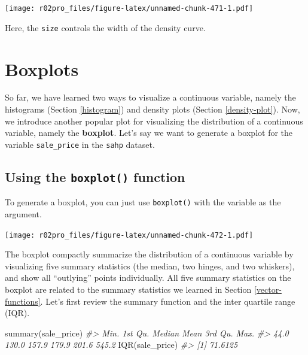 \documentclass[
]{book}
\newenvironment{Shaded}{\begin{snugshade}}{\end{snugshade}}
\newcommand{\CommentTok}[1]{\textcolor[rgb]{0.56,0.35,0.01}{\textit{#1}}}
\newcommand{\FunctionTok}[1]{\textcolor[rgb]{0.00,0.00,0.00}{#1}}
\newcommand{\NormalTok}[1]{#1}
\newcommand{\OtherTok}[1]{\textcolor[rgb]{0.56,0.35,0.01}{#1}}
\newcommand{\SpecialCharTok}[1]{\textcolor[rgb]{0.00,0.00,0.00}{#1}}
\begin{document}
\texttt{[image: r02pro\_files/figure-latex/unnamed-chunk-471-1.pdf]}

Here, the \texttt{size} controls the width of the density curve.

\hypertarget{boxplots}{%
\section{Boxplots}\label{boxplots}}

So far, we have learned two ways to visualize a continuous variable, namely the histograms (Section \ref{histogram}) and density plots (Section \ref{density-plot}). Now, we introduce another popular plot for visualizing the distribution of a continuous variable, namely the \textbf{boxplot}. Let's say we want to generate a boxplot for the variable \texttt{sale\_price} in the \texttt{sahp} dataset.

\hypertarget{using-the-boxplot-function}{%
\subsection{\texorpdfstring{Using the \texttt{boxplot()} function}{Using the boxplot() function}}\label{using-the-boxplot-function}}

To generate a boxplot, you can just use \texttt{boxplot()} with the variable as the argument.

\begin{Shaded}
\end{Shaded}

\texttt{[image: r02pro\_files/figure-latex/unnamed-chunk-472-1.pdf]}

The boxplot compactly summarize the distribution of a continuous variable by visualizing five summary statistics (the median, two hinges, and two whiskers), and show all ``outlying'' points individually. All five summary statistics on the boxplot are related to the summary statistics we learned in Section \ref{vector-functions}. Let's first review the summary function and the inter quartile range (IQR).

\begin{Shaded}
\begin{Highlighting}[]
\FunctionTok{summary}\NormalTok{(sale\_price)}
\CommentTok{\#\textgreater{}    Min. 1st Qu.  Median    Mean 3rd Qu.    Max. }
\CommentTok{\#\textgreater{}    44.0   130.0   157.9   179.9   201.6   545.2}
\FunctionTok{IQR}\NormalTok{(sale\_price)}
\CommentTok{\#\textgreater{} [1] 71.6125}
\end{Highlighting}
\end{Shaded}
\end{document}
